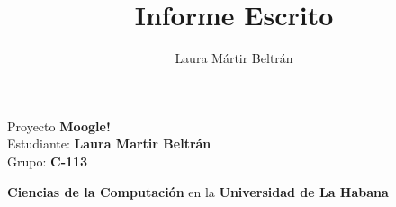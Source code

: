 \documentclass[12pt,a4paper,onecolumn]{report}
\author{Laura Mártir Beltrán}
\title{Informe Escrito}
\begin{document}
\begin{LARGE}

\begin{flushleft}

Proyecto \textbf{Moogle!}\\
Estudiante: \textbf{Laura Martir Beltrán}\\
Grupo: \textbf{C-113}\\

\end{flushleft}

\end{LARGE}

\begin{flushleft}
\begin{Large}
\textbf{Ciencias de la Computación} en la \textbf{Universidad de La Habana}\\

\end{Large}

\end{flushleft}
\end{document}
